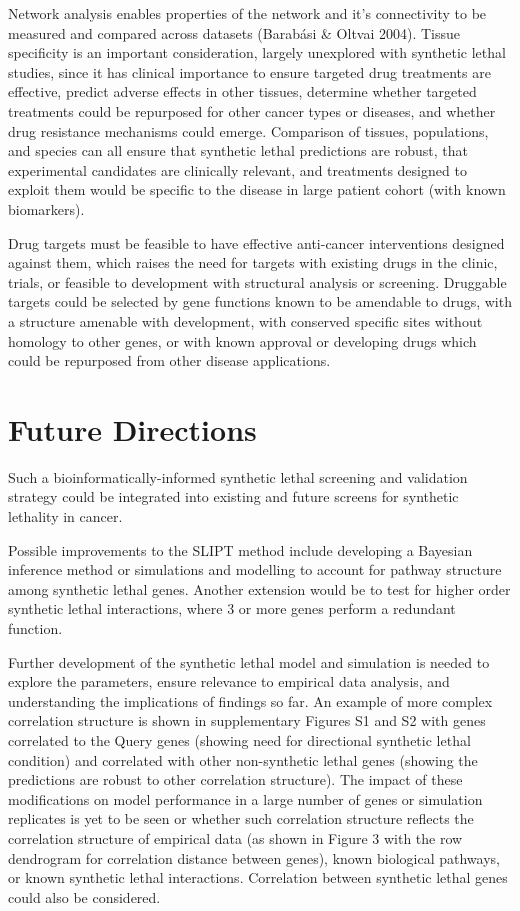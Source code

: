 Network analysis enables properties of the network and it’s connectivity to be measured and compared across datasets (Barabási \& Oltvai 2004).  Tissue specificity is an important consideration, largely unexplored with synthetic lethal studies, since it has clinical importance to ensure targeted drug treatments are effective, predict adverse effects in other tissues, determine whether targeted treatments could be repurposed for other cancer types or diseases, and whether drug resistance mechanisms could emerge.  Comparison of tissues, populations, and species can all ensure that synthetic lethal predictions are robust, that experimental candidates are clinically relevant, and treatments designed to exploit them would be specific to the disease in large patient cohort (with known biomarkers).

Drug targets must be feasible to have effective anti-cancer interventions designed against them, which raises the need for targets with existing drugs in the clinic, trials, or feasible to development with structural analysis or screening.  Druggable targets could be selected by gene functions known to be amendable to drugs, with a structure amenable with development, with conserved specific sites without homology to other genes, or with known approval or developing drugs which could be repurposed from other disease applications.

\section{Future Directions}
\label{chap6:future}

Such a bioinformatically-informed synthetic lethal screening and validation strategy could be integrated into existing and future screens for synthetic lethality in cancer. 

Possible improvements to the SLIPT method include developing a Bayesian inference method or simulations and modelling to account for pathway structure among synthetic lethal genes. Another extension would be to test for higher order synthetic lethal interactions, where 3 or more genes perform a redundant function. 



Further development of the synthetic lethal model and simulation is needed to explore the parameters, ensure relevance to empirical data analysis, and understanding the implications of findings so far.  An example of more complex correlation structure is shown in supplementary Figures S1 and S2 with genes correlated to the Query genes (showing need for directional synthetic lethal condition) and correlated with other non-synthetic lethal genes (showing the predictions are robust to other correlation structure).  The impact of these modifications on model performance in a large number of genes or simulation replicates is yet to be seen or whether such correlation structure reflects the correlation structure of empirical data (as shown in Figure 3 with the row dendrogram for correlation distance between genes), known biological pathways, or known synthetic lethal interactions. Correlation between synthetic lethal genes could also be considered.

